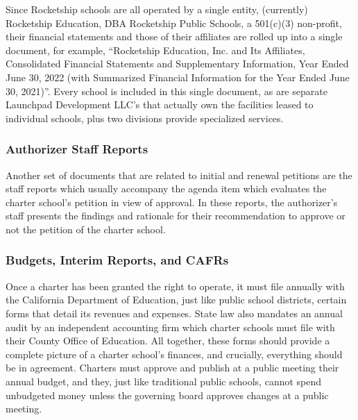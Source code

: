 Since Rocketship schools are all operated by a single entity, (currently) Rocketship Education, DBA Rocketship Public Schools, a 501(c)(3) non-profit, their financial statements and those of their affiliates are rolled up into a single document, for example, ``Rocketship Education, Inc. and Its Affiliates, Consolidated Financial Statements and Supplementary Information, Year Ended June 30, 2022
(with Summarized Financial Information for the Year Ended June 30, 2021)''.  Every school is included in this single document, as are separate Launchpad Development LLC's that actually own the facilities leased to individual schools, plus two divisions provide specialized services. %

\subsubsection{Authorizer Staff Reports}\label{sec:cs-staff-reports}\indent%

Another set of documents that are related to initial and renewal petitions are the staff reports which usually accompany the agenda item which evaluates the charter school's petition in view of approval. In these reports, the authorizer's staff presents the findings and rationale for their recommendation to approve or not the petition of the charter school.

\newpage
\subsubsection{Budgets,  Interim Reports, and CAFRs}\label{sec:budgets-etc}\indent%

Once a charter has been granted the right to operate, it must file annually with the California Department of Education, just like public school districts, certain forms that detail its revenues and expenses. State law also mandates an annual audit by an independent accounting firm which charter schools must file with their County Office of Education. All together, these forms should provide a complete picture of a charter school's finances, and crucially, everything should be in agreement. Charters must approve and publish at a public meeting their annual budget, and they, just like traditional public schools, cannot spend unbudgeted money unless the governing board approves changes at a public meeting.

